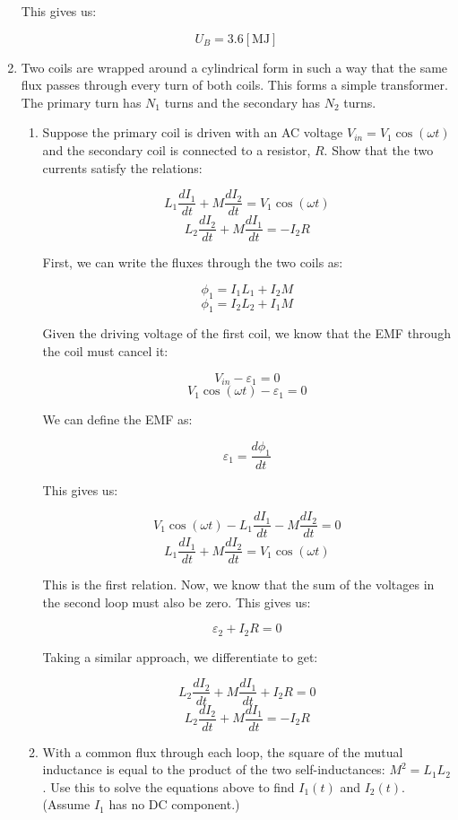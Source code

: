 \begin{enumerate}
    This gives us:

    $$\boxed{U_B=3.6[\si{\mega\joule}]}$$

  \item Two coils are wrapped around a cylindrical form in such a way that the same flux passes through every turn of both coils. This forms a simple transformer. The primary turn has $N_1$ turns and the secondary has $N_2$ turns.

    \begin{enumerate}

      \item Suppose the primary coil is driven with an AC voltage $V_{in}=V_1\cos(\omega t)$ and the secondary coil is connected to a resistor, $R$. Show that the two currents satisfy the relations:

        $$L_1\frac{dI_1}{dt}+M\frac{dI_2}{dt}=V_1\cos(\omega t)$$
        $$L_2\frac{dI_2}{dt}+M\frac{dI_1}{dt}=-I_2R$$

        First, we can write the fluxes through the two coils as:

        $$\phi_1=I_1L_1+I_2M$$
        $$\phi_1=I_2L_2+I_1M$$

        Given the driving voltage of the first coil, we know that the EMF through the coil must cancel it:

        $$V_{in}-\varepsilon_1=0$$
        $$V_1\cos(\omega t)-\varepsilon_1=0$$

        We can define the EMF as:

        $$\varepsilon_1=\frac{d\phi_1}{dt}$$

        This gives us:

        $$V_1\cos(\omega t)-L_1\frac{dI_1}{dt}-M\frac{dI_2}{dt}=0$$
        $$\boxed{L_1\frac{dI_1}{dt}+M\frac{dI_2}{dt}=V_1\cos(\omega t)}$$

        This is the first relation. Now, we know that the sum of the voltages in the second loop must also be zero. This gives us:

        $$\varepsilon_2+I_2R=0$$

        Taking a similar approach, we differentiate to get:

        $$L_2\frac{dI_2}{dt}+M\frac{dI_1}{dt}+I_2R=0$$
        $$\boxed{L_2\frac{dI_2}{dt}+M\frac{dI_1}{dt}=-I_2R}$$

      \item  With a common flux through each loop, the square of the mutual inductance is equal to the product of the two self-inductances: $M^2 =L_1L_2$. Use this to solve the equations above to find $I_1(t)$ and $I_2(t)$. (Assume $I_1$ has no DC component.)


\end{enumerate}
\end{enumerate}
